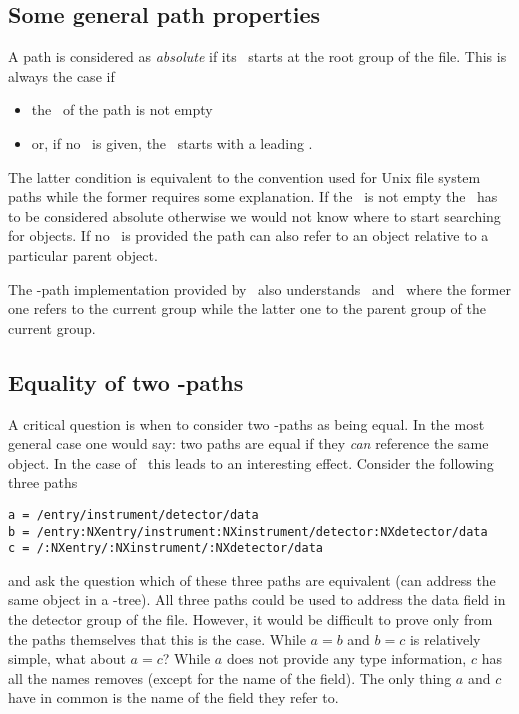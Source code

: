 \subsection{Some general path properties}

A path is considered as \emph{absolute} if its \osection\ starts at the root
group of the file. This is always  the case if 
\begin{itemize}
\item the \fsection\ of the path is not empty
\item or, if no \fsection\ is given, the \osection\ starts with a leading \osep.
\end{itemize}
The latter condition is equivalent to the convention used for Unix file system
paths while the former requires some explanation. 
If the \fsection\ is not empty the \osection\ has to be considered absolute
otherwise we would not know where to start searching for objects. 
If no \fsection\ is provided the path can also refer to an object relative to
a particular parent object.

The \nexus-path implementation provided by \libpniio\ also understands 
\cgroup\ and \pgroup\ where the former one refers to the current group while 
the latter one to the parent group of the current group.

\subsection{Equality of two \nexus-paths}

A critical question is when to consider two \nexus-paths as being equal. 
In the most general case one would say: two paths are equal if they \emph{can}
reference the same object. In the case of \nexus\ this leads to an interesting 
effect. Consider the following three paths
\begin{verbatim}
a = /entry/instrument/detector/data
b = /entry:NXentry/instrument:NXinstrument/detector:NXdetector/data
c = /:NXentry/:NXinstrument/:NXdetector/data
\end{verbatim}
and ask the question which of these three paths are equivalent (can address the
same object in a \nexus-tree). All three paths could be used to address the 
data field in the detector group of the file. However, it would be difficult to 
prove only from the paths themselves that this is the case. While $a=b$ and
$b=c$ is relatively simple, what about $a=c$? While $a$ does not provide 
any type information, $c$ has all the names removes (except for the name of the
field). The only thing $a$ and $c$ have in common is the name of the field 
they refer to.

